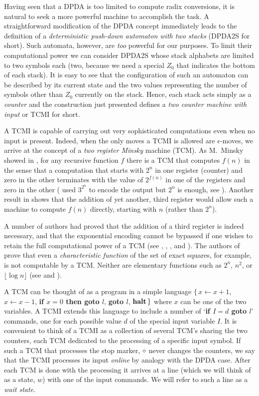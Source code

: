 \documentclass[12pt]{article}
\begin{document}
Having seen that a DPDA is too limited to
compute radix conversions, it is natural to seek a more powerful
machine to accomplish the task. A straightforward modification of the
DPDA concept immediately leads to the definition of a {\it
  deterministic push-down automaton with two stacks} (DPDA2S for short). Such automata,
however, are {\it too\/} powerful for our purposes. To limit
their computational power we can consider DPDA2S whose stack
alphabets are limited to two symbols each (two, because we need a
special $Z_0$ that indicates the bottom of each stack). It is easy to
see that the configuration of such an automaton can be described by its
current state and the two values representing the number of symbols other
than $Z_0$ currently on the stack. Hence, each stack acts simply as a
{\it counter\/} and the construction just presented defines a {\it two
counter machine with input\/} or TCMI for short.

A TCMI is capable of carrying out very sophisticated
computations even when no input is present. Indeed, when the
only moves a TCMI is allowed are $\epsilon$-moves, we arrive at the
concept of a {\it two register Minsky\/} machine (TCM). As M.~Minsky showed
in \cite{Minsky}, for any recursive function $f$ there is a TCM that
computes $f(n)$ in the sense that a computation that starts with $2^n$
in one register (counter) and zero in the other terminates with the
value of $2^{f(n)}$ in one of the registers and zero in the
other (\cite{Minsky} used $3^{2^n}$ to encode the output but $2^n$ is
enough, see \cite{Bardz}). Another result in \cite{Minsky} shows that the addition of yet
another, third register would allow such a machine to compute $f(n)$
directly, starting with $n$ (rather than $2^n$).

A number of authors had proved that the addition of a third register is
indeed necessary, and that the exponential encoding cannot be bypassed if
one wishes to retain the full computational power of a TCM (see
\cite{Schroep}, \cite{ibarra}, \cite{Bardz}, and \cite{holkutr}). The authors of
\cite{ibarra} prove that even a {\it characteristic function\/} of the
set of exact squares, for example, is not computable by a TCM. Neither
are elementary functions such as $2^n$, $n^2$, or $\lfloor\log n\rfloor$ (see
\cite{Bardz} and \cite{Schroep}).

A TCM can be thought of as a program in a simple language
$\{\,x\leftarrow x+1$, $x\leftarrow x-1$, {\bf if $x=0$ then goto
  $l$}, {\bf goto $l$}, $\mbox{\bf halt}\,\}$ where $x$ can be one of
the two variables. A TCMI extends this language to include a number of `{\bf if
  $I=d$ goto $l$}' commands, one for each possible value $d$ of the
special input variable $I$. It is convenient to think of a TCMI as a
collection of several TCM's sharing the two counters, each TCM
dedicated to the processing of a specific input symbol. If such a TCM
that processes the stop marker, $\diamond$ never changes the counters, we say that the
TCMI processes its input {\it online} by analogy with the DPDA case.
After each TCM is done with the processing it arrives at a line (which
we will think of as a state, $w$) with one of the input commands. We
will refer to such a line as a {\it wait state\/}.
\end{document}
